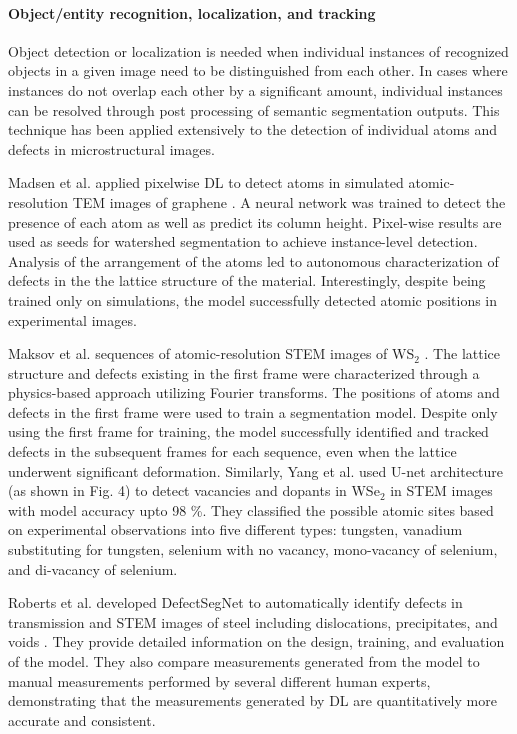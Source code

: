 \documentclass[pdflatex,sn-mathphys]{sn-jnl}%
\theoremstyle{thmstyleone}%
\theoremstyle{thmstyletwo}%
\theoremstyle{thmstylethree}%
\begin{document}
\paragraph{Object/entity recognition, localization, and tracking}
Object detection or localization is needed when individual instances of recognized objects in a given image need to be distinguished from each other. In cases where instances do not overlap each other by a significant amount, individual instances can be resolved through post processing of semantic segmentation outputs. This technique has been applied extensively to the detection of individual atoms and defects in microstructural images.

Madsen et al. applied pixelwise DL to detect atoms in simulated atomic-resolution TEM images of graphene \cite{madsen2018deep}. A neural network was trained to detect the presence of each atom as well as predict its column height. Pixel-wise results are used as seeds for watershed segmentation to achieve instance-level detection. Analysis of the arrangement of the atoms led to autonomous characterization of defects in the the lattice structure of the material. Interestingly, despite being trained only on simulations, the model successfully detected atomic positions in experimental images.

Maksov et al. sequences of atomic-resolution STEM images of WS$_2$ \cite{maksov2019deep}. The lattice structure and defects existing in the first frame were characterized through a physics-based approach utilizing Fourier transforms. The positions of atoms and defects in the first frame were used to train a segmentation model. Despite only using the first frame for training, the model successfully identified and tracked defects in the subsequent frames for each sequence, even when the lattice underwent significant deformation. Similarly, Yang et al. used U-net architecture (as shown in Fig. 4) to detect vacancies and dopants in WSe$_2$ in STEM images with model accuracy upto 98 \%. They classified the possible atomic sites based on experimental observations into five different types: tungsten, vanadium substituting for tungsten, selenium with no vacancy, mono-vacancy of selenium, and di-vacancy of selenium.


Roberts et al. developed DefectSegNet to automatically identify defects in transmission and STEM images of steel including dislocations, precipitates, and voids \cite{roberts2019deep}. They provide detailed information on the design, training, and evaluation of the model. They also compare measurements generated from the model to manual measurements performed by several different human experts, demonstrating that the measurements generated by DL are quantitatively more accurate and consistent. 
\end{document}
